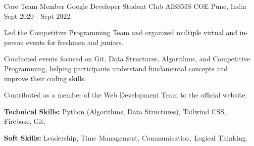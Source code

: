 

\begin{cventries}

  \cventry
    {Core Team Member Google Developer Student Club} %
    {AISSMS COE} %
    {Pune, India} %
    {Sept 2020 - Sept 2022} %
    {
      \begin{cvitems} %
        \item {Led the Competitive Programming Team and organized multiple virtual and in-person events for freshmen and juniors.}
        \item {Conducted events focused on Git, Data Structures, Algorithms, and Competitive Programming, helping participants understand fundamental concepts and improve their coding skills.}
        \item {Contributed as a member of the Web Development Team to the  official website.}
        \item {\textbf{Technical Skills:} Python (Algorithms, Data Structures), Tailwind CSS, Firebase, Git.}
        \item {\textbf{Soft Skills:} Leadership, Time Management, Communication, Logical Thinking.}
      \end{cvitems}
    }


\end{cventries}
